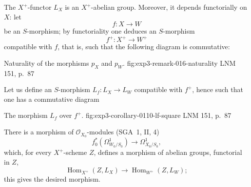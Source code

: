 The \(X^+\)-functor \(L_X\) is an \(X^+\)-abelian group.
Moreover, it depends functorially on \(X\): let
\[
 f:X\longrightarrow W
\]
be an \(S\)-morphism; by functoriality one deduces an \(S\)-morphism
\[
 f^+:X^+\longrightarrow W^+
\]
compatible with \(f\), that is, such that the following diagram is
commutative:

  {Naturality of the morphisms \(p_X\) and \(p_W\).}
  {fig:exp3-remark-016-naturality}
  {LNM 151, p.~87}

Let us define an \(S\)-morphism \(L_f:L_X\to L_W\) compatible with \(f^+\),
hence such that one has a commutative diagram

  {The morphism \(L_f\) over \(f^+\).}
  {fig:exp3-corollary-0110-lf-square}
  {LNM 151, p.~87}

There is a morphism of \(\mathscr O_{X_0}\)-modules (SGA~1, II, 4)
\[
 f_0^*(\Omega^1_{W_0/S_0})\longrightarrow\Omega^1_{X_0/S_0},
\]
which, for every \(X^+\)-scheme \(Z\), defines a morphism of abelian groups,
functorial in \(Z\),
\[
 \operatorname{Hom}_{X^+}(Z,L_X)\longrightarrow\operatorname{Hom}_{W^+}(Z,L_W);
\]
this gives the desired morphism.

